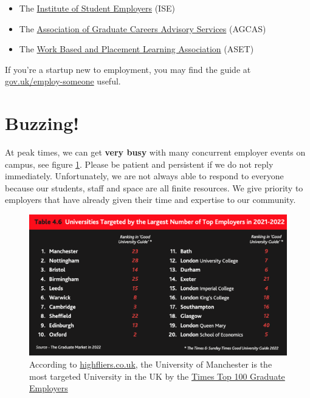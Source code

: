 \documentclass[
  12pt,
]{book}
\providecommand{\tightlist}{%
  \setlength{\itemsep}{0pt}\setlength{\parskip}{0pt}}
\begin{document}
\begin{itemize}
\tightlist
\item
  The \href{https://ise.org.uk/}{Institute of Student Employers} (ISE)
\item
  The \href{https://www.agcas.org.uk}{Association of Graduate Careers Advisory Services} (AGCAS)
\item
  The \href{https://www.asetonline.org}{Work Based and Placement Learning Association} (ASET)
\end{itemize}

If you're a startup new to employment, you may find the guide at \href{https://www.gov.uk/employ-someone}{gov.uk/employ-someone} useful.

\hypertarget{buzzing}{%
\section{Buzzing!}\label{buzzing}}

At peak times, we can get \textbf{very busy} with many concurrent employer events on campus, see figure \ref{fig:busy-fig}. Please be patient and persistent if we do not reply immediately. Unfortunately, we are not always able to respond to everyone because our students, staff and space are all finite resources. We give priority to employers that have already given their time and expertise to our community.



\begin{figure}

{\centering \includegraphics[width=1\linewidth]{images/high-fliers-table-2022} 

}

\caption{According to \href{https://www.highfliers.co.uk}{highfliers.co.uk}, the University of Manchester is the most targeted University in the UK by the \href{https://www.top100graduateemployers.com}{Times Top 100 Graduate Employers} \citep{highfliers2022}}\label{fig:busy-fig}
\end{figure}
\end{document}
